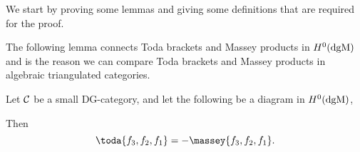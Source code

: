 We start by proving some lemmas and giving some definitions that are required for the proof.

The following lemma connects Toda brackets and Massey products in \( H^0(\operatorname{dgM}) \) and is the reason we can compare Toda brackets and Massey products in algebraic triangulated categories.

\begin{lemma}
    Let \( {\mathcal{C}} \) be a small DG-category, and let the following be a diagram in \( H^0(\operatorname{dgM}) \),
    \begin{center}
    \end{center}
    Then
    \[
        \toda{f_3, f_2, f_1} = -\massey{f_3, f_2, f_1}.
    \]
\end{lemma}
